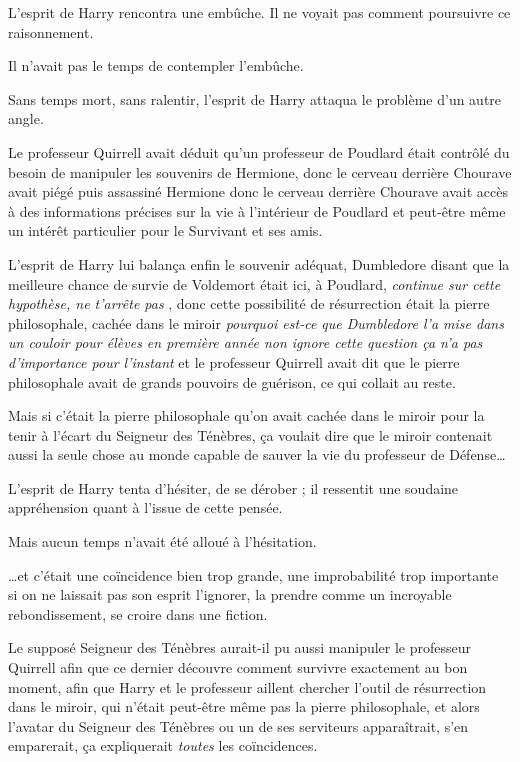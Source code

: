 L'esprit de Harry rencontra une embûche. Il ne voyait pas comment poursuivre ce raisonnement.

Il n'avait pas le temps de contempler l'embûche.

Sans temps mort, sans ralentir, l'esprit de Harry attaqua le problème d'un autre angle.

Le professeur Quirrell avait déduit qu'un professeur de Poudlard était contrôlé du besoin de manipuler les souvenirs de Hermione, donc le cerveau derrière Chourave avait piégé puis assassiné Hermione donc le cerveau derrière Chourave avait accès à des informations précises sur la vie à l'intérieur de Poudlard et peut-être même un intérêt particulier pour le Survivant et ses amis.

L'esprit de Harry lui balança enfin le souvenir adéquat, Dumbledore disant que la meilleure chance de survie de Voldemort était ici, à Poudlard, \emph{continue sur cette hypothèse, ne t'arrête pas} , donc cette possibilité de résurrection était la pierre philosophale, cachée dans le miroir \emph{pourquoi est-ce que Dumbledore l'a mise dans un couloir pour élèves en première année non ignore cette question ça n'a pas d'importance pour l'instant}  et le professeur Quirrell avait dit que le pierre philosophale avait de grands pouvoirs de guérison, ce qui collait au reste.

Mais si c'était la pierre philosophale qu'on avait cachée dans le miroir pour la tenir à l'écart du Seigneur des Ténèbres, ça voulait dire que le miroir contenait aussi la seule chose au monde capable de sauver la vie du professeur de Défense…

L'esprit de Harry tenta d'hésiter, de se dérober ; il ressentit une soudaine appréhension quant à l'issue de cette pensée.

Mais aucun temps n'avait été alloué à l'hésitation.

…et c'était une coïncidence bien trop grande, une improbabilité trop importante si on ne laissait pas son esprit l'ignorer, la prendre comme un incroyable rebondissement, se croire dans une fiction.

Le supposé Seigneur des Ténèbres aurait-il pu aussi manipuler le professeur Quirrell afin que ce dernier découvre comment survivre exactement au bon moment, afin que Harry et le professeur aillent chercher l'outil de résurrection dans le miroir, qui n'était peut-être même pas la pierre philosophale, et alors l'avatar du Seigneur des Ténèbres ou un de ses serviteurs apparaîtrait, s'en emparerait, ça expliquerait \emph{toutes}  les coïncidences.

